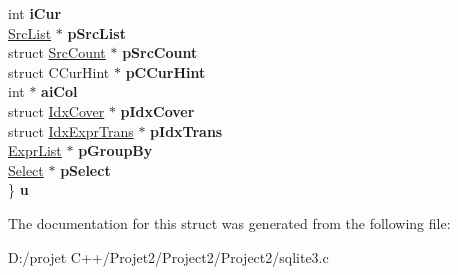 \begin{DoxyCompactItemize}
\begin{tabbing}
\>int {\bfseries iCur}\\
\>\mbox{\hyperlink{struct_src_list}{SrcList}} $\ast$ {\bfseries pSrcList}\\
\>struct \mbox{\hyperlink{struct_src_count}{SrcCount}} $\ast$ {\bfseries pSrcCount}\\
\>struct CCurHint $\ast$ {\bfseries pCCurHint}\\
\>int $\ast$ {\bfseries aiCol}\\
\>struct \mbox{\hyperlink{struct_idx_cover}{IdxCover}} $\ast$ {\bfseries pIdxCover}\\
\>struct \mbox{\hyperlink{struct_idx_expr_trans}{IdxExprTrans}} $\ast$ {\bfseries pIdxTrans}\\
\>\mbox{\hyperlink{struct_expr_list}{ExprList}} $\ast$ {\bfseries pGroupBy}\\
\>\mbox{\hyperlink{struct_select}{Select}} $\ast$ {\bfseries pSelect}\\
\} {\bfseries u}\\

\end{tabbing}\end{DoxyCompactItemize}


The documentation for this struct was generated from the following file\+:\begin{DoxyCompactItemize}
\item 
D\+:/projet C++/\+Projet2/\+Project2/\+Project2/sqlite3.\+c\end{DoxyCompactItemize}
